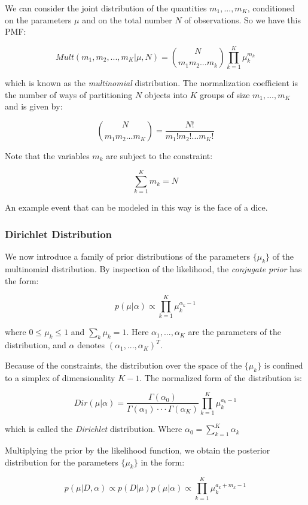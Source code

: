 \documentclass{article}
\begin{document}
We can consider the joint distribution of the quantities
\(m_1, ..., m_K\), conditioned on the parameters \(\mu\) and on the
total number \(N\) of observations. So we have this PMF:

\[Mult(m_1, m_2, ..., m_K | \mu, N) = \binom{N}{m_1 m_2 ... m_k} \prod_{k=1}^K
\mu_k^{m_k}\]

which is known as the \emph{multinomial} distribution. The normalization
coefficient is the number of ways of partitioning \(N\) objects into
\(K\) groups of size \(m_1,
..., m_K\) and is given by:

\[\binom{N}{m_1 m_2 ... m_K} = \frac{N!}{m_1! m_2! ... m_K!}\]

Note that the variables \(m_k\) are subject to the constraint:

\[\sum_{k=1}^K m_k = N\]

An example event that can be modeled in this way is the face of a dice.

\subsubsection{Dirichlet Distribution}\label{dirichlet-distribution}

We now introduce a family of prior distributions of the parameters
\(\{ \mu_k \}\) of the multinomial distribution. By inspection of the
likelihood, the \emph{conjugate prior} has the form:

\[p(\mu| \alpha) \propto \prod_{k=1}^K \mu_k^{\alpha_k - 1}\]

where \(0 \le \mu_k \le 1\) and \(\sum_k \mu_k = 1\). Here
\(\alpha_1, ..., \alpha_K\) are the parameters of the distribution, and
\(\alpha\) denotes \((\alpha_1, ...,
\alpha_K)^T\).

Because of the constraints, the distribution over the space of the
\(\{\mu_k\}\) is confined to a simplex of dimensionality \(K-1\). The
normalized form of the distribution is:

\[Dir(\mu| \alpha) = \frac{\Gamma (\alpha_0)}{\Gamma (\alpha_1) \cdot \cdot
\cdot \Gamma (\alpha_K)} \prod_{k=1}^K \mu_k^{a_k - 1}\]

which is called the \emph{Dirichlet} distribution. Where
\(\alpha_0 = \sum_{k=1}^K
\alpha_k\)

Multiplying the prior by the likelihood function, we obtain the
posterior distribution for the parameters \(\{\mu_k \}\) in the form:

\[p(\mu| D, \alpha) \propto p(D|\mu) p(\mu | \alpha) \propto \prod_{k=1}^K
\mu_k^{a_k + m_k - 1}\]
\end{document}

